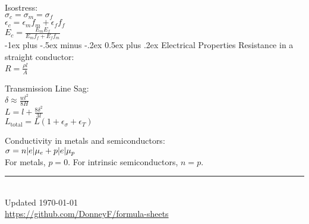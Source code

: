 \documentclass[12pt,landscape]{article}
\makeatletter
\renewcommand{\section}{\@startsection{section}{1}{0mm}%
                                {-1ex plus -.5ex minus -.2ex}%
                                {0.5ex plus .2ex}%
                                {\normalfont\normalsize\bfseries}}
\newcommand{\tab}{\hspace*{1em}}
\newcommand{\ds}{\displaystyle}
\theoremstyle{definition}
\makeatother
\begin{document}
\begin{multicols*}{3}
Isostress:\\
\tab $\sigma_c = \sigma_m = \sigma_f$\\
\tab $\epsilon_c = \epsilon_m f_m + \epsilon_f f_f$\\
\tab $\ds E_c = \frac{E_m E_f}{E_mf_f + E_f f_m}$\\

\section{Electrical Properties}
Resistance in a straight conductor:\\
\tab $\ds R = \frac{\rho l}{A}$

Transmission Line Sag:\\
\tab $\ds \delta \approx \frac{wl^2}{8H}$\\
\tab $L = l + \frac{8\delta^2}{3l}$\\
\tab $L_\text{total} = L(1 + \epsilon_\sigma + \epsilon_T)$

Conductivity in metals and semiconductors:\\
\tab $\sigma = n\abs{e}\mu_e + p\abs{e}\mu_p$\\
\tab For metals, $p = 0$. For intrinsic semiconductors, $n = p$.

\rule{0.3\linewidth}{0.25pt}
\scriptsize\\
Updated \today\\
\href{https://github.com/DonneyF/formula-sheets}{https://github.com/DonneyF/formula-sheets}
\end{multicols*}%
\end{document}

